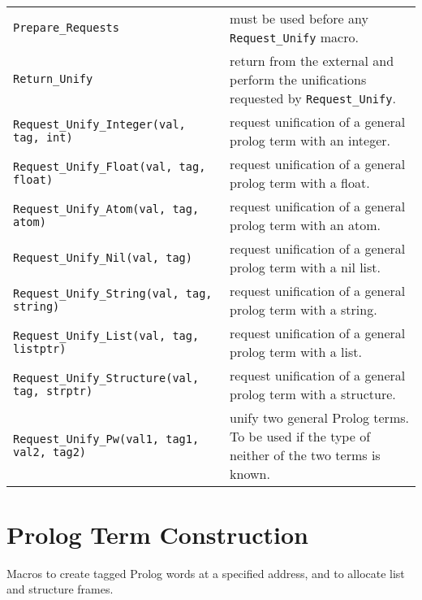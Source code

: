 \noindent
 \\
\begin{tabular}{|p{8.3cm}p{7.0cm}|} 
\hline
{\tt Prepare_Requests} & must be used before any {\tt Request_Unify} macro. \\

{\tt Return_Unify} & return from the external and perform the
unifications requested by {\tt Request_Unify}. \\

{\tt Request_Unify_Integer(val, tag, int)} & request unification of a general prolog term with an integer. \\ 

{\tt Request_Unify_Float(val, tag, float)} & request unification of a general prolog term with a float. \\ 

{\tt Request_Unify_Atom(val, tag, atom)} & request unification of a general prolog term with an atom. \\

{\tt Request_Unify_Nil(val, tag)} & request unification of a general prolog term with a nil list. \\

{\tt Request_Unify_String(val, tag, string)} & request unification of a general prolog term with a string. \\

{\tt Request_Unify_List(val, tag, listptr)} & request unification of a general prolog term with a list. \\ 

{\tt Request_Unify_Structure(val, tag, strptr)} & request unification of a general prolog term with a structure. \\

{\tt Request_Unify_Pw(val1, tag1, val2, tag2)} & unify two general Prolog terms.  To be used if
the type of neither of the two terms is
known. \\ 
\hline
\end{tabular}

\vspace{0.5cm}


\section{Prolog Term Construction}
Macros to create tagged Prolog words at a specified address, and to
allocate list and structure frames.


